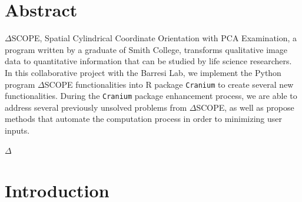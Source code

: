 \documentclass[10pt,letterpaper]{article}
\newcommand{\getIndex}[2]{
  \ForEach{,}{\IfEq{#1}{\thislevelitem}{\number\thislevelcount\ExitForEach}{}}{#2}
}
\newcommand{\getAff}[1]{
  \getIndex{#1}{}
}
\begin{document}
\vspace*{0.2in}

\section*{Abstract}
\(\Delta\)SCOPE, Spatial Cylindrical Coordinate Orientation with PCA
Examination, a program written by a graduate of Smith College,
transforms qualitative image data to quantitative information that can
be studied by life science researchers. In this collaborative project
with the Barresi Lab, we implement the Python program \(\Delta\)SCOPE
functionalities into R package \texttt{Cranium} to create several new
functionalities. During the \texttt{Cranium} package enhancement
process, we are able to address several previously unsolved problems
from \(\Delta\)SCOPE, as well as propose methods that automate the
computation process in order to minimizing user inputs.


\linenumbers

\(\Delta\)

\hypertarget{introduction}{%
\section{Introduction}\label{introduction}}
\end{document}
